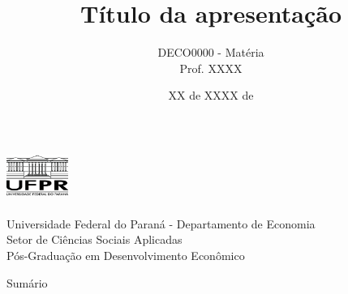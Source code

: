 \documentclass[aspectratio=169, 9pt]{beamer}
\title[short-title]{Título da apresentação}
\author[Felipe Duplat Luz]{DECO0000 - Matéria \\ Prof. XXXX}
\institute[UFPR] %
{
    \vspace{0.5mm} {\normalsize Felipe Duplat Luz} \vspace{5mm}
}
\date{XX de XXXX de \the\year{}}
\begin{document}
\begin{frame}[plain]
    \begin{center}
            \begin{minipage}[c]{0.2\linewidth}
                    \begin{center}
                    \includegraphics[width=2cm, height=1.7cm]{./Imagens/logo_UFPR.png} 
                    \end{center}
            \end{minipage}
            \begin{minipage}[c]{0.7\linewidth}
                    \begin{flushleft}
                    \begin{large}
                    Universidade Federal do Paraná - Departamento de Economia \\ \vspace{1mm} Setor de Ciências Sociais Aplicadas \\
                    \vspace{1mm} Pós-Graduação em Desenvolvimento Econômico
                    \end{large} 
                    \end{flushleft}
            \end{minipage}
    \end{center}
\titlepage 
\end{frame}

\begingroup
{}
\begin{frame}{Sumário}
	\tableofcontents[hideallsubsections]
\end{frame}
\endgroup


\nocite{*}



\end{document}
